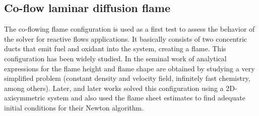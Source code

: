 
\subsection{Co-flow laminar diffusion flame}\label{ssec:coflowFlame}
The co-flowing flame configuration is used as a first test to assess the behavior of the solver for reactive flows applications. It basically consists of two concentric ducts that emit fuel and oxidant into the system, creating a flame. This configuration has been widely studied. In the seminal work of \cite{burkeDiffusionFlames1928} analytical expressions for the flame height and flame shape are obtained by studying a very simplified problem (constant density and velocity field, infinitely fast chemistry, among others). Later, \cite{smookeNumericalModelingAxisymmetric1992} and later works solved this configuration using a 2D-axisymmetric system and also used the flame sheet estimates to find adequate initial conditions for their Newton algorithm. 

